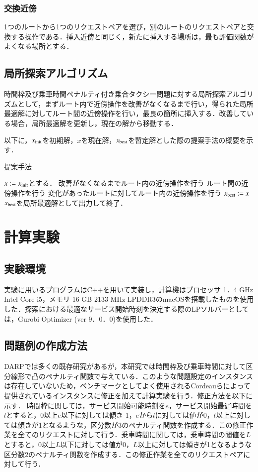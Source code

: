 \documentclass[a4j，11pt，twocolumn]{jsarticle}
\begin{document}
\subsubsection{交換近傍}
1つのルートから1つのリクエストペアを選び，別のルートのリクエストペアと交換する操作である．挿入近傍と同じく，新たに挿入する場所は，最も評価関数がよくなる場所とする．
\subsection{局所探索アルゴリズム}
時間枠及び乗車時間ペナルティ付き乗合タクシー問題に対する局所探索アルゴリズムとして，まずルート内で近傍操作を改善がなくなるまで行い，得られた局所最適解に対してルート間の近傍操作を行い，最良の箇所に挿入する．改善している場合，局所最適解を更新し，現在の解から移動する．

以下に，$x_{\rm init}$を初期解，$x$を現在解，$x_{\rm best}$を暫定解とした際の提案手法の概要を示す．
\begin{algorithm}
 \caption{提案手法}
 \label{algo1}
 \begin{algorithmic}[1]%
  \STATE $x := x_{\rm init}$とする．
  \STATE 改善がなくなるまでルート内の近傍操作を行う
  \STATE ルート間の近傍操作を行う
  \STATE 変化があったルートに対してルート内の近傍操作を行う
  \STATE  $x_{\rm best} := x$
  \ENDIF
  \STATE $x_{\rm best}$を局所最適解として出力して終了．
 \end{algorithmic}
\end{algorithm}

\section{計算実験}
\subsection{実験環境}
実験に用いるプログラムはC++を用いて実装し，計算機はプロセッサ 1．4 GHz Intel Core i5，メモリ 16 GB 2133 MHz LPDDR3のmacOSを搭載したものを使用した．探索における最適なサービス開始時刻を決定する際のLPソルバーとしては，Gurobi Optimizer (ver 9．0．0)を使用した．

\subsection{問題例の作成方法}
DARPでは多くの既存研究があるが，本研究では時間枠及び乗車時間に対して区分線形で凸のペナルティ関数で与えている．このような問題設定のインスタンスは存在していないため，ベンチマークとしてよく使用されるCordeauらによって提供されている\cite{tabu}インスタンスに修正を加えて計算実験を行う．修正方法を以下に示す．
時間枠に関しては，サービス開始可能時刻を$e$，サービス開始最遅時間を$l$とすると，0以上$e$以下に対しては傾き-1，$e$から$l$に対しては値が0，$l$以上に対しては傾きが1となるような，区分数が3のペナルティ関数を作成する．この修正作業を全てのリクエストに対して行う．乗車時間に関しては，乗車時間の閾値を$L$とすると，0以上$L$以下に対しては値が0，$L$以上に対しては傾きが1となるような区分数2のペナルティ関数を作成する．この修正作業を全てのリクエストペアに対して行う．
\end{document}
